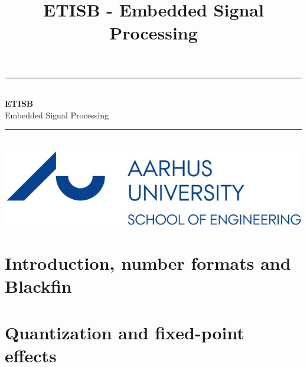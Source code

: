 \documentclass[12pt,a4paper,danish]{book}
\title{ETISB - Embedded Signal Processing}
\newcommand{\HRule}{\rule{\linewidth}{0.5mm}}
\begin{document}
\begin{titlepage}
	\clearpage\thispagestyle{empty}
	\begin{center}
		\HRule \\[0.4cm]
		{\huge \bfseries ETISB} \\[.3cm] {\huge Embedded Signal Processing}\\[0cm]
		\HRule \\[3.4cm]
		\includegraphics[width=0.5\linewidth]{graphics/au}
	\end{center}
\end{titlepage}

\tableofcontents

\chapter{Introduction, number formats and Blackfin}


\chapter{Quantization and fixed-point effects}

\end{document}
